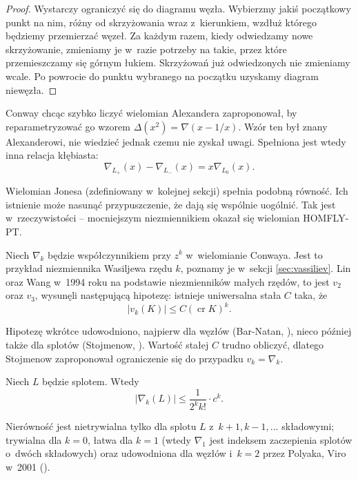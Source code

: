 \begin{proof}
    Wystarczy ograniczyć się do diagramu węzła.
    Wybierzmy jakiś początkowy punkt na nim, różny od skrzyżowania wraz z~kierunkiem, wzdłuż którego będziemy przemierzać węzeł.
    Za każdym razem, kiedy odwiedzamy nowe skrzyżowanie, zmieniamy je w~razie potrzeby na takie, przez które przemieszczamy się górnym łukiem.
    Skrzyżowań już odwiedzonych nie zmieniamy wcale. Po powrocie do punktu wybranego na początku uzyskamy diagram niewęzła.
\end{proof}

Conway chcąc szybko liczyć wielomian Alexandera zaproponował, by reparametryzować go wzorem $\Delta(x^2) = \nabla(x - 1/x)$.
Wzór ten był znany Alexanderowi, nie wiedzieć jednak czemu nie zyskał uwagi.
Spełniona jest wtedy inna relacja kłębiasta:
\begin{equation}
    \nabla_{L_+}(x)- \nabla_{L_-}(x) = x \nabla_{L_0}(x).
\end{equation}

Wielomian Jonesa (zdefiniowany w~kolejnej sekcji) spełnia podobną równość.
Ich istnienie może nasunąć przypuszczenie, że dają się wspólnie uogólnić.
Tak jest w~rzeczywistości -- mocniejszym niezmiennikiem okazał się wielomian HOMFLY-PT.

Niech $\nabla_k$ będzie współczynnikiem przy $z^k$ w~wielomianie Conwaya.
Jest to przykład niezmiennika Wasiljewa rzędu $k$, poznamy je w~sekcji \ref{sec:vassiliev}.
Lin oraz Wang w~1994 roku na podstawie niezmienników małych rzędów, to jest $v_2$ oraz $v_3$, wysunęli następującą hipotezę: istnieje uniwersalna stała $C$ taka, że
\begin{equation}
    |v_k(K)| \le C (\operatorname{cr} K)^k.
\end{equation}

Hipotezę wkrótce udowodniono, najpierw dla węzłów (Bar-Natan, \cite{barnatan95}), nieco później także dla splotów (Stojmenow, \cite{stoimenow_01}).
Wartość stałej $C$ trudno obliczyć, dlatego Stojmenow zaproponował ograniczenie się do przypadku $v_k = \nabla_k$.

\begin{conjecture}
    Niech $L$ będzie splotem.
    Wtedy
    \begin{equation}
        |\nabla_k(L)| \le \frac{1}{2^kk!} \cdot c^k.
    \end{equation}
\end{conjecture}

Nierówność jest nietrywialna tylko dla splotu $L$ z~$k+1, k-1, \ldots$ składowymi; trywialna dla $k = 0$, łatwa dla $k=1$ (wtedy $\nabla_1$ jest indeksem zaczepienia splotów o~dwóch składowych) oraz udowodniona dla węzłów i~$k=2$ przez Polyaka, Viro w~2001 (\cite{polyak01}).

